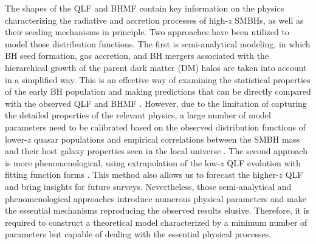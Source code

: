 \documentclass[twocolumn, twocolappendix]{aastex63}
\begin{document}
\begin{CJK*}{UTF8}{gbsn}
The shapes of the QLF and BHMF contain key information on the physics characterizing the radiative 
and accretion processes of high-$z$ SMBHs, as well as their seeding mechanisms in principle.
Two approaches have been utilized to model those distribution functions.  
The first is semi-analytical modeling, in which BH seed formation, gas accretion, and BH mergers associated 
with the hierarchical growth of the parent dark matter (DM) halos are taken into account in a simplified way. 
This is an effective way of examining the statistical properties of the early BH population and making predictions 
that can be directly compared with the observed QLF and BHMF
\citep[e.g.,][]{1998ApJ...503..505H,2010ApJ...718..231S,2018MNRAS.474.1995R,2018MNRAS.481.3278R,
2021MNRAS.508.2706Y,2021ApJ...910L..11K,2022MNRAS.511..616T,2022arXiv220714689O}. 
However, due to the limitation of capturing the detailed properties of the relevant physics, 
a large number of model parameters need to be calibrated based on the observed distribution functions 
of lower-$z$ quasar populations \citep[e.g.,][]{2007ApJ...669...45H}
and empirical correlations between the SMBH mass and their host galaxy properties seen
in the local universe \citep{2013ARA&A..51..511K}.
The second approach is more phenomenological, using extrapolation of the low-$z$ QLF evolution with 
fitting function forms \citep[e.g.,][]{2019MNRAS.488.1035K,2020MNRAS.495.3252S,2022arXiv220702233F}.
This method also allows us to forecast the higher-$z$ QLF and bring insights for future surveys.
Nevertheless, those semi-analytical and phenomenological approaches introduce numerous physical parameters
and make the essential mechanisms reproducing the observed results elusive.
Therefore, it is required to construct a theoretical model characterized by a minimum number of parameters
but capable of dealing with the essential physical processes.



\end{CJK*}
\end{document}
